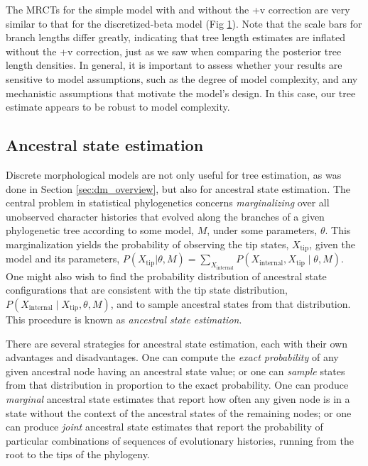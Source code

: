 \begin{figure}[h!]
\label{fig:mk_discretized_majrule}
\end{figure}

The MRCTs for the simple model with and without the +v correction are very similar to that for the discretized-beta model (Fig \ref{fig:mk_discretized_majrule}).
Note that the scale bars for branch lengths differ greatly, indicating that tree length estimates are inflated without the +v correction, just as we saw when comparing the posterior tree length densities.
In general, it is important to assess whether your results are sensitive to model assumptions, such as the degree of model complexity, and any mechanistic assumptions that motivate the model's design.
In this case, our tree estimate appears to be robust to model complexity.

\subsection{Ancestral state estimation} \label{sec:anc_states}

Discrete morphological models are not only useful for tree estimation, as was done in Section \ref{sec:dm_overview}, but also for ancestral state estimation.
The central problem in statistical phylogenetics concerns {\it marginalizing} over all unobserved character histories that evolved along the branches of a given phylogenetic tree according to some model, $M$, under some parameters, $\theta$.
This marginalization yields the probability of observing the tip states, $X_\text{tip}$, given the model and its parameters, $P( X_\text{tip} | \theta, M ) = \sum_{X_\text{internal}} P( X_\text{internal}, X_\text{tip} \mid \theta, M )$.
One might also wish to find the probability distribution of ancestral state configurations that are consistent with the tip state distribution, $P( X_\text{internal} \mid X_\text{tip}, \theta, M )$, and to sample ancestral states from that distribution.
This procedure is known as {\it ancestral state estimation}.

There are several strategies for ancestral state estimation, each with their own advantages and disadvantages.
One can compute the {\it exact probability} of any given ancestral node having an ancestral state value; or one can {\it sample} states from that distribution in proportion to the exact probability.
One can produce {\it marginal} ancestral state estimates that report how often any given node is in a state without the context of the ancestral states of the remaining nodes; or one can produce {\it joint} ancestral state estimates that report the probability of particular combinations of sequences of evolutionary histories, running from the root to the tips of the phylogeny.

